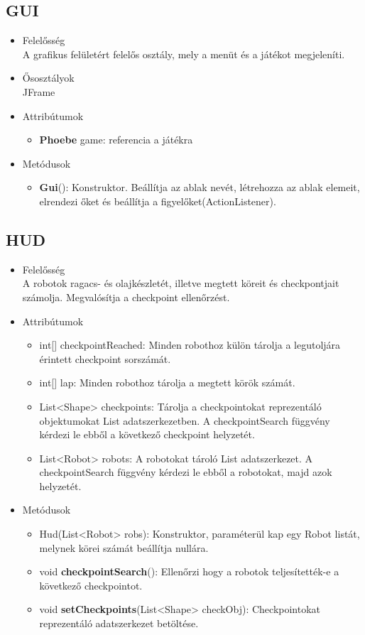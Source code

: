\subsection{GUI}
\begin{itemize}
\item Felelősség\\
A grafikus felületért felelős osztály, mely a menüt és a játékot megjeleníti.
\item Ősosztályok\\
JFrame
\item Attribútumok
	\begin{itemize}
		\item \textbf{Phoebe} game: referencia a játékra
	\end{itemize}
\item Metódusok
	\begin{itemize}
		\item\textbf{ Gui}(): Konstruktor. Beállítja az ablak nevét, létrehozza az ablak elemeit, elrendezi őket és beállítja a figyelőket(ActionListener).
	\end{itemize}
\end{itemize}

\subsection{HUD}
\begin{itemize}
\item Felelősség\\
A robotok ragacs- és olajkészletét, illetve megtett köreit és checkpontjait számolja. Megvalósítja a checkpoint ellenőrzést.
\item Attribútumok
	\begin{itemize}
		\item int[] checkpointReached: Minden robothoz külön tárolja a legutoljára érintett checkpoint sorszámát.
		\item int[] lap: Minden robothoz tárolja a megtett körök számát. 
		\item List<Shape> checkpoints: Tárolja a checkpointokat reprezentáló objektumokat List adatszerkezetben. A checkpointSearch függvény kérdezi le ebből a következő checkpoint helyzetét. 
		\item List<Robot> robots: A robotokat tároló List adatszerkezet. A checkpointSearch függvény kérdezi le ebből a robotokat, majd azok helyzetét.
	\end{itemize}
\item Metódusok
	\begin{itemize}
		\item Hud(List<Robot> robs): Konstruktor, paraméterül kap egy Robot listát, melynek körei számát beállítja nullára. 
		\item void \textbf{checkpointSearch}(): Ellenőrzi hogy a robotok teljesítették-e a következő checkpointot.
		\item void \textbf{setCheckpoints}(List<Shape> checkObj): Checkpointokat reprezentáló adatszerkezet betöltése.
		
	\end{itemize}
\end{itemize}

